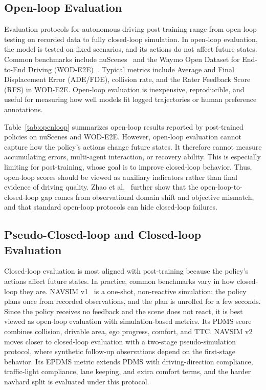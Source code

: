 \documentclass[runningheads]{llncs}
\begin{document}


\subsection{Open-loop Evaluation}
\label{sec:eval:openloop}

Evaluation protocols for autonomous driving post-training range from open-loop testing on recorded data to fully closed-loop simulation. In open-loop evaluation, the model is tested on fixed scenarios, and its actions do not affect future states. Common benchmarks include nuScenes~\cite{nuscenes2020} and the Waymo Open Dataset for End-to-End Driving (WOD-E2E)~\cite{wode2e2025}. Typical metrics include Average and Final Displacement Error (ADE/FDE), collision rate, and the Rater Feedback Score (RFS) in WOD-E2E. Open-loop evaluation is inexpensive, reproducible, and useful for measuring how well models fit logged trajectories or human preference annotations.

Table~\ref{tab:openloop} summarizes open-loop results reported by post-trained policies on nuScenes and WOD-E2E. However, open-loop evaluation cannot capture how the policy's actions change future states. It therefore cannot measure accumulating errors, multi-agent interaction, or recovery ability. This is especially limiting for post-training, whose goal is to improve closed-loop behavior. Thus, open-loop scores should be viewed as auxiliary indicators rather than final evidence of driving quality. Zhao et al.~\cite{bridgesim2026} further show that the open-loop-to-closed-loop gap comes from observational domain shift and objective mismatch, and that standard open-loop protocols can hide closed-loop failures.



\subsection{Pseudo-Closed-loop and Closed-loop Evaluation}
\label{sec:eval:closedloop}

Closed-loop evaluation is most aligned with post-training because the policy's actions affect future states. In practice, common benchmarks vary in how closed-loop they are. NAVSIM v1~\cite{navsim2024} is a one-shot, non-reactive simulation: the policy plans once from recorded observations, and the plan is unrolled for a few seconds. Since the policy receives no feedback and the scene does not react, it is best viewed as open-loop evaluation with simulation-based metrics. Its PDMS score combines collision, drivable area, ego progress, comfort, and TTC. NAVSIM v2~\cite{navsimv2_2025} moves closer to closed-loop evaluation with a two-stage pseudo-simulation protocol, where synthetic follow-up observations depend on the first-stage behavior. Its EPDMS metric extends PDMS with driving-direction compliance, traffic-light compliance, lane keeping, and extra comfort terms, and the harder navhard split is evaluated under this protocol.
\end{document}
